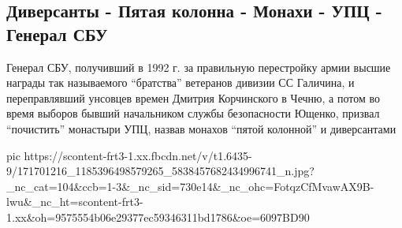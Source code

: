  
 
 
 
 

\subsection{Диверсанты - Пятая колонна - Монахи - УПЦ - Генерал СБУ}
\label{sec:11_04_2021.fb.berdnik_miroslava.3.upc_chistka_vrag_general_sbu}

Генерал СБУ, получивший в 1992 г. за правильную перестройку армии высшие
награды так называемого \enquote{братства} ветеранов дивизии СС Галичина, и
переправлявший унсовцев времен Дмитрия Корчинского в Чечню,  а потом во время
выборов бывший начальником службы безопасности Ющенко, призвал \enquote{почистить}
монастыри УПЦ, назвав монахов \enquote{пятой колонной} и диверсантами

\ifcmt
  pic https://scontent-frt3-1.xx.fbcdn.net/v/t1.6435-9/171701216_1185396498579265_5838457682434996741_n.jpg?_nc_cat=104&ccb=1-3&_nc_sid=730e14&_nc_ohc=FotqzCfMvawAX9B-lwu&_nc_ht=scontent-frt3-1.xx&oh=9575554b06e29377ec59346311bd1786&oe=6097BD90
\fi

